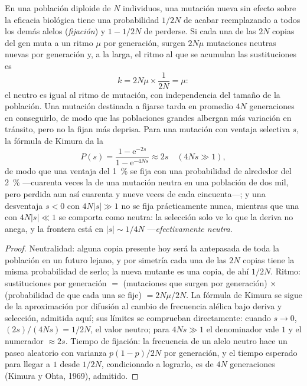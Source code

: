 \begin{theorem}\label{thm:b3:molecular-evolution:neutral}
En una población diploide de $N$ individuos, una mutación nueva sin
efecto sobre la eficacia biológica tiene una probabilidad $1/2N$ de
acabar reemplazando a todos los demás alelos (\emph{fijación}) y
$1 - 1/2N$ de perderse. Si cada una de las $2N$ copias del gen muta a un
ritmo $\mu$ por generación, surgen $2N\mu$ mutaciones neutras nuevas por
generación y, a la larga, el ritmo al que se acumulan las sustituciones
es
\[
k = 2N\mu\times\frac{1}{2N} = \mu :
\]
el \emph{} neutro es igual al ritmo de mutación, con
independencia del tamaño de la población. Una mutación destinada a
fijarse tarda en promedio $4N$ generaciones en conseguirlo, de modo que
las poblaciones grandes albergan más variación en tránsito, pero no la
fijan más deprisa. Para una mutación con ventaja selectiva $s$, la
fórmula de Kimura da la 
\[
P(s) = \frac{1 - \mathrm{e}^{-2s}}{1 - \mathrm{e}^{-4Ns}} \approx 2s
\quad (4Ns \gg 1),
\]
de modo que una ventaja del \qty{1}{\%} se fija con una probabilidad de
alrededor del \qty{2}{\%} ---cuarenta veces la de una mutación neutra en
una población de dos mil, pero perdida aun así cuarenta y nueve veces de
cada cincuenta---; y una desventaja $s < 0$ con $4N|s| \gg 1$ no se fija
prácticamente nunca, mientras que una con $4N|s| \ll 1$ se comporta como
neutra: la selección solo ve lo que la deriva no anega, y la frontera
está en $|s| \sim
1/4N$ ---\emph{efectivamente neutra}.
\end{theorem}
\begin{proof}
Neutralidad: alguna copia presente hoy será la antepasada de toda la
población en un futuro lejano, y por simetría cada una de las $2N$
copias tiene la misma probabilidad de serlo; la nueva mutante es una
copia, de ahí $1/2N$. Ritmo: sustituciones por generación $=$
(mutaciones que surgen por generación) $\times$ (probabilidad de que
cada una se fije) $= 2N\mu/2N$. La fórmula de Kimura se sigue de la
aproximación por difusión al cambio de frecuencia alélica bajo deriva y
selección, admitida aquí; sus límites se comprueban directamente:
cuando $s \to 0$, $(2s)/(4Ns) = 1/2N$, el valor neutro; para
$4Ns \gg 1$ el denominador vale $1$ y el numerador $\approx 2s$. Tiempo
de fijación: la frecuencia de un alelo neutro hace un paseo aleatorio
con varianza $p(1-p)/2N$ por generación, y el tiempo esperado para
llegar a $1$ desde $1/2N$, condicionado a lograrlo, es de $4N$
generaciones (Kimura y Ohta, 1969), admitido.
\end{proof}

